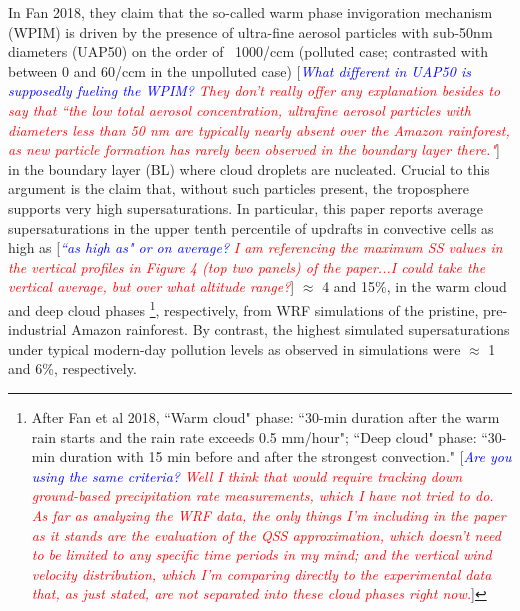 \documentclass{article}
\newcommand{\drcomm}[1]{\textcolor{blue}{\textit{#1}}}
\newcommand{\klcomm}[1]{\textcolor{red}{\textit{#1}}}
\begin{document}
In Fan 2018, they claim that the so-called warm phase invigoration mechanism (WPIM) is driven by the presence of ultra-fine aerosol particles with sub-50nm diameters (UAP50) on the order of ~1000/ccm (polluted case; contrasted with between 0 and 60/ccm in the unpolluted case) [\drcomm{What different in UAP50 is supposedly fueling the WPIM?} \klcomm{They don't really offer any explanation besides to say that ``the low total aerosol concentration, ultrafine aerosol particles with diameters less than 50 nm are typically nearly absent over the Amazon rainforest, as new particle formation has rarely been observed in the boundary layer there."}] in the boundary layer (BL) where cloud droplets are nucleated. Crucial to this argument is the claim that, without such particles present, the troposphere supports very high supersaturations. In particular, this paper reports average supersaturations in the upper tenth percentile of updrafts in convective cells as high as [\drcomm{``as high as" or on average?} \klcomm{I am referencing the maximum SS values in the vertical profiles in Figure 4 (top two panels) of the paper...I could take the vertical average, but over what altitude range?}] $\approx$ 4 and 15\%, in the warm cloud and deep cloud phases \footnote{After Fan et al 2018, ``Warm cloud" phase: ``30-min duration after the warm rain starts and the rain rate exceeds 0.5 mm/hour"; ``Deep cloud" phase: ``30-min duration with 15 min before and after the strongest convection." [\drcomm{Are you using the same criteria?} \klcomm{Well I think that would require tracking down ground-based precipitation rate measurements, which I have not tried to do. As far as analyzing the WRF data, the only things I'm including in the paper as it stands are the evaluation of the QSS approximation, which doesn't need to be limited to any specific time periods in my mind; and the vertical wind velocity distribution, which I'm comparing directly to the experimental data that, as just stated, are not separated into these cloud phases right now.}]}, respectively, from WRF simulations of the pristine, pre-industrial Amazon rainforest. By contrast, the highest simulated supersaturations under typical modern-day pollution levels as observed in simulations were $\approx$ 1 and 6\%, respectively. 
\end{document}
